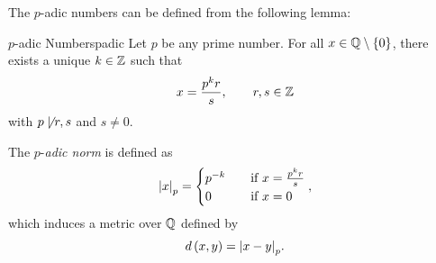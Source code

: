 \documentclass[math]{amznotes}
\theoremstyle{remark}
\begin{document}
The $p$-adic numbers can be defined from the following lemma:
\begin{lembox}{$p$-adic Numbers}{padic}
    Let $p$ be any prime number. For all $x \in \mathbb{Q} \setminus \left\{0\right\}$, there exists a unique $k \in \mathbb{Z}$ such that
    \begin{equation*}
        x = \frac{p^kr}{s}, \qquad r, s \in \mathbb{Z}
    \end{equation*}
    with $p \not\mid r, s$ and $s \neq 0$.
\end{lembox}
The $p$-\textit{adic norm} is defined as 
\begin{equation*}
    {\left\lvert {x} \right\rvert}_p = \begin{cases}
        p^{-k} & \quad\textrm{if } x = \frac{p^kr}{s} \\
        0 & \quad\textrm{if } x = 0
    \end{cases},
\end{equation*}
which induces a metric over $\mathbb{Q}$ defined by 
\begin{equation*}
    d\left(x, y\right) ={\left\lvert {x - y} \right\rvert}_p.
\end{equation*}
\end{document}
